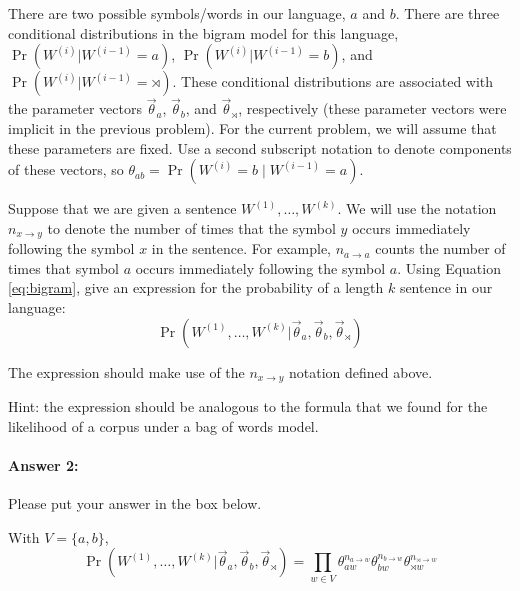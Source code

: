 \documentclass[10pt]{article}
\newenvironment{AnswerBox}{\begin{mdframed}[style=simple]}{\end{mdframed}}
\begin{document}
There are two possible symbols/words in our language, $a$ and $b$. There are
three conditional distributions in the bigram model for this language, 
$\Pr(W^{(i)} | W^{(i-1)}=a)$, $\Pr(W^{(i)} | W^{(i-1)}=b)$, and
$\Pr(W^{(i)} | W^{(i-1)}=\rtimes)$. 
These conditional distributions are associated with the
parameter vectors $\vec{\theta}_{a}$, $\vec{\theta}_{b}$, and
$\vec{\theta}_{\rtimes}$, respectively (these parameter vectors were implicit in the
previous problem). For the current problem, we will assume that these
parameters are fixed. Use a second subscript notation to denote components of
these vectors, so $\theta_{ab}= \Pr(W^{(i)}=b\mid W^{(i-1)}=a)$.

 Suppose that we are given a sentence $W^{(1)},\dots,W^{(k)}$. We will
use the notation $n_{x \rightarrow y}$ to denote the number of times
that the symbol $y$ occurs immediately following the symbol $x$ in the
sentence. For example, $n_{a \rightarrow a}$ counts the number of
times that symbol $a$ occurs immediately following the symbol $a$.
Using Equation \ref{eq:bigram}, give an expression for the probability
of a length $k$ sentence in our language:
\begin{equation*}
\Pr(W^{(1)},\dots,W^{(k)} | \vec{\theta}_{a}, \vec{\theta}_{b}, \vec{\theta}_{\rtimes})
\end{equation*}

 The expression should make use of the $n_{x \rightarrow y}$ notation
defined above.

 Hint: the expression should be analogous to the formula that we found
for the likelihood of a corpus under a bag of words model.

\paragraph{Answer 2:} Please put your answer in the box below.

\begin{AnswerBox}%
With $V=\{a,b\}$, 
\begin{equation}\label{eq:prob_se}
    \Pr(W^{(1)},\dots,W^{(k)} | \vec{\theta}_{a}, \vec{\theta}_{b}, \vec{\theta}_{\rtimes}) = \prod_{w\in V} \theta_{aw}^{n_{a \rightarrow w}} \theta_{bw}^{n_{b \rightarrow w}} \theta_{\rtimes w}^{n_{\rtimes \rightarrow w}}
\end{equation}
\end{AnswerBox}%

\hrulefill %
\end{document}

